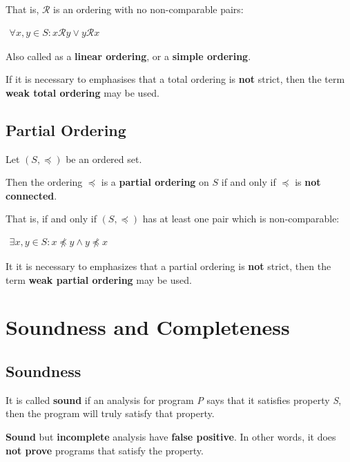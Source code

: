 That is, $\mathcal{R}$ is an ordering with no non-comparable pairs:


\begin{math}
  \begin{array}{c}
    \forall x, y \in S: x \mathcal{R} y \lor y \mathcal{R} x
  \end{array}
\end{math}

Also called as a \textbf{linear ordering}, or a \textbf{simple
  ordering}.

If it is necessary to emphasises that a total ordering is \textbf{not}
strict, then the term \textbf{weak total ordering} may be used.


\subsection{Partial Ordering}

Let $(S, \preceq)$ be an ordered set.

Then the ordering $\preceq$ is a \textbf{partial ordering} on $S$ if
and only if $\preceq$ is \textbf{not connected}.

That is, if and only if $(S, \preceq)$ has at least one pair which is
non-comparable:

\begin{math}
  \begin{array}{c}
    \exists x, y \in S : x \npreceq y \land y \npreceq x
  \end{array}
\end{math}


It it is necessary to emphasizes that a partial ordering is
\textbf{not} strict, then the term \textbf{weak partial ordering} may
be used.


\section{Soundness and Completeness}

\subsection{Soundness}


It is called \textbf{sound} if an analysis for program \textsl{P} says
that it satisfies property \textsl{S}, then the program will truly
satisfy that property.

\textbf{Sound} but \textbf{incomplete} analysis have \textbf{false
  positive}. In other words, it does \textbf{not prove} programs that
satisfy the property.

